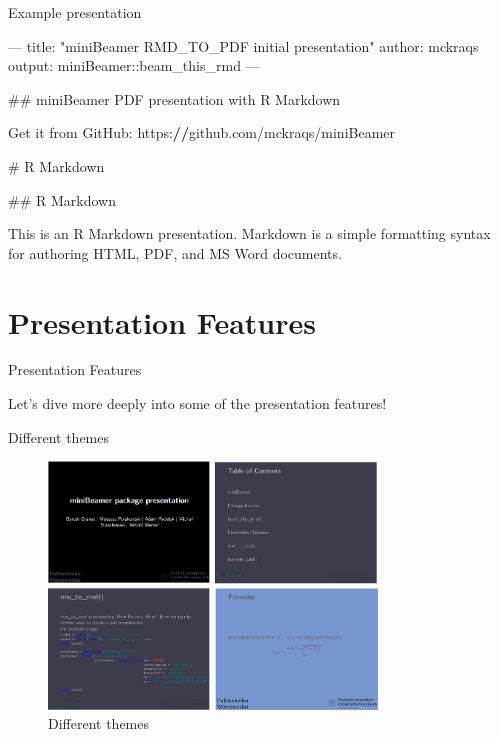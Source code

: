 \documentclass[
  ignorenonframetext,
]{beamer}
\newenvironment{Shaded}{}{}
\newcommand{\CommentTok}[1]{\textcolor[rgb]{0.00,0.50,0.00}{#1}}
\newcommand{\ControlFlowTok}[1]{\textcolor[rgb]{0.00,0.00,1.00}{#1}}
\newcommand{\ErrorTok}[1]{\textcolor[rgb]{1.00,0.00,0.00}{\textbf{#1}}}
\newcommand{\NormalTok}[1]{#1}
\newcommand{\OperatorTok}[1]{#1}
\newcommand{\StringTok}[1]{\textcolor[rgb]{0.00,0.50,0.50}{#1}}
\begin{document}
\begin{frame}[fragile]{Example presentation}
\protect\hypertarget{example-presentation}{}

\scriptsize

\begin{Shaded}
\begin{Highlighting}[]
\OperatorTok{---}
\NormalTok{title}\OperatorTok{:}\StringTok{ "miniBeamer RMD_TO_PDF initial presentation"}
\NormalTok{author}\OperatorTok{:}\StringTok{ }\NormalTok{mckraqs}
\NormalTok{output}\OperatorTok{:}\StringTok{ }\NormalTok{miniBeamer}\OperatorTok{::}\NormalTok{beam_this_rmd}
\OperatorTok{---}

\CommentTok{## miniBeamer PDF presentation with R Markdown}

\NormalTok{Get it from GitHub}\OperatorTok{:}\StringTok{ }\NormalTok{https}\OperatorTok{:}\ErrorTok{//}\NormalTok{github.com}\OperatorTok{/}\NormalTok{mckraqs}\OperatorTok{/}\NormalTok{miniBeamer}

\CommentTok{# R Markdown}

\CommentTok{## R Markdown}

\NormalTok{This is an R Markdown presentation. Markdown is a simple formatting syntax}
\ControlFlowTok{for}\NormalTok{ authoring HTML, PDF, and MS Word documents.}
\end{Highlighting}
\end{Shaded}

\end{frame}

\hypertarget{presentation-features}{%
\section{Presentation Features}\label{presentation-features}}

\begin{frame}{Presentation Features}
\protect\hypertarget{presentation-features-1}{}

Let's dive more deeply into some of the presentation features!

\end{frame}

\begin{frame}{Different themes}
\protect\hypertarget{different-themes}{}

\begin{figure}
\centering
\includegraphics[width=3.4375in,height=\textheight]{themes2.png}
\caption{Different themes}
\end{figure}

\end{frame}
\end{document}

